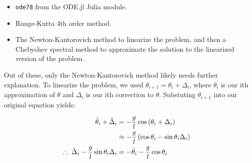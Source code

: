 \documentclass[12pt,a4paper,openright]{article}
\begin{document}
	\begin{itemize}
		\item \texttt{ode78} from the ODE.jl Julia module.
		\item Runge-Kutta 4th order method.
		\item The Newton-Kantorovich method to linearize the problem, and then a Chebyshev spectral method to approximate the solution to the linearized version of the problem.
	\end{itemize}

	Out of these, only the Newton-Kantorovich method likely needs further explanation. To linearize the problem, we used $\theta_{i+1} = \theta_{i} + \Delta_i$, where ${\theta}_i$ is our ith approximation of $\theta$ and $\Delta_i$ is our ith correction to $\theta$. Substuting $\theta_{i+1}$ into our original equation yields:

	\begin{align*}
		\ddot{\theta}_i + \ddot{\Delta}_i &= -\dfrac{g}{l} \cos{(\theta_i+\Delta_i)} \\
		&\approx -\dfrac{g}{l} \left(\cos{\theta_i} - \sin{\theta_i} \Delta_i\right) \\
		\therefore \hspace{0.1cm} \ddot{\Delta}_i - \dfrac{g}{l} \sin{\theta_i} \Delta_i &= -\ddot{\theta}_i - \dfrac{g}{l} \cos{\theta_i}
	\end{align*}
\end{document}

